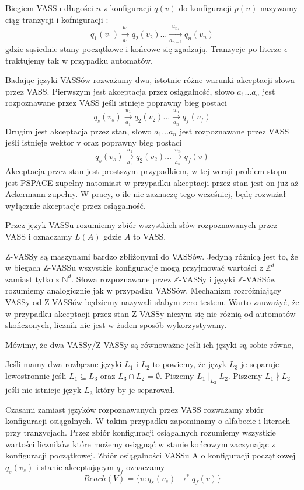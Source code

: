     Biegiem VASSu długości $n$ z konfiguracji $q(v)$ do konfiguracji $p(u)$ nazywamy ciąg tranzycji i kofniguracji :
    \[q_1(v_1) \xrightarrow[a_1]{u_1} q_2(v_2) \dots \xrightarrow[a_{n-1}]{u_{n_1}} q_n(v_n) \] gdzie
    sąsiednie stany początkowe i końcowe się zgadzają.
    Tranzycje po literze $\epsilon$ traktujemy tak w przypadku automatów.

    Badając języki VASSów rozważamy dwa, istotnie różne warunki akceptacji słowa przez VASS.
    Pierwszym jest akceptacja przez osiągalność,
    słowo $a_1 \dots a_n$ jest rozpoznawane przez VASS jeśli istnieje poprawny bieg postaci
    \[q_s(v_s) \xrightarrow[a_1]{u_1} q_2(v_2) \dots \xrightarrow[a_{n}]{u_{n}} q_f(v_f) \]
    Drugim jest akceptacja przez stan,
    słowo $a_1 \dots a_n$ jest rozpoznawane przez VASS jeśli istnieje wektor v oraz poprawny bieg postaci
    \[q_s(v_s) \xrightarrow[a_1]{u_1} q_2(v_2) \dots \xrightarrow[a_{n}]{u_{n}} q_f(v) \]
    Akceptacja przez stan jest prostszym przypadkiem, w tej wersji problem stopu jest PSPACE-zupełny natomiast w przypadku
    akceptacji przez stan jest on już aż Ackermann-zupełny.
    W pracy, o ile nie zaznaczę tego wcześniej, będę rozważał wyłącznie akceptacje przez osiągalność.


    Przez język VASSu rozumiemy zbiór wszystkich słów rozpoznawanych przez VASS i oznaczamy $L(A)$ gdzie $A$ to VASS.


    Z-VASSy są maszynami bardzo zbliżonymi do VASSów.
    Jedyną różnicą jest to, że w biegach Z-VASSu wszystkie konfiguracje mogą przyjmować wartości z $\mathbb{Z}^d$ zamiast tylko z $\mathbb{N}^d$.
    Słowa rozpoznawane przez $\mathbb{Z}$-VASSy i języki $\mathbb{Z}$-VASSów rozumiemy analogicznie jak w przypadku VASSów.
    Mechanizm rozróżniający VASSy od Z-VASSów będziemy nazywali słabym zero testem.
    Warto zauważyć, że w przypadku akceptacji przez stan Z-VASSy niczym się nie różnią od automatów skończonych, licznik nie jest w żaden sposób wykorzystywany.

    Mówimy, że dwa VASSy/Z-VASSy są równoważne jeśli ich języki są sobie równe,

    Jeśli mamy dwa rozłączne języki $L_1$ i $L_2$ to powiemy, że język $L_3$ je separuje lewostronnie jeśli
    $L_1 \subseteq L_3$ oraz $L_3 \cap L_2 = \emptyset$.
    Piszemy $L_1 \mid_{L_3} L_2$.
    Piszemy $L_1 \nmid L_2$ jeśli nie istnieje język $L_3$ który by je separował.

    Czasami zamiast języków rozpoznawanych przez VASS rozważamy zbiór konfiguracji osiągalnych.
    W takim przypadku zapominamy  o alfabecie i literach przy tranzycjach.
    Przez zbiór konfiguracji osiągalnych rozumiemy wszystkie wartości liczników które możemy osiągnąć w stanie końcowym zaczynając z konfiguracji początkowej.
    Zbiór osiągalności VASSu A o konfiguracji początkowej $q_s(v_s)$ i stanie akceptującym $q_f$ oznaczamy
    \[Reach(V) = \{v:q_s(v_s)\rightarrow^*q_f(v)\}\]


